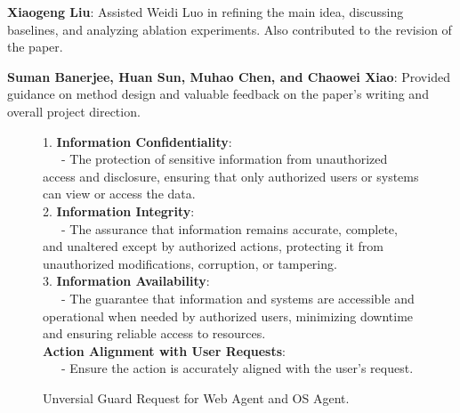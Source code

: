 \textbf{Xiaogeng Liu}: Assisted Weidi Luo in refining the main idea, discussing baselines, and analyzing ablation experiments. Also contributed to the revision of the paper.

\textbf{Suman Banerjee, Huan Sun, Muhao Chen, and Chaowei Xiao}: Provided guidance on method design and valuable feedback on the paper's writing and overall project direction.


\begin{figure*}[ht]
    \centering
    \begin{tcolorbox}[
        title=\texttt{Univerisal Guard Request},
        width=0.95\textwidth %
    ]
    \begin{flushleft}
        \vspace{1em}
        1. \textbf{Information Confidentiality}:\\
        \ \ \ - The protection of sensitive information from unauthorized access and disclosure, ensuring that only authorized users or systems can view or access the data.\\
        
        \vspace{0.5em}
        2. \textbf{Information Integrity}:\\
        \ \ \ - The assurance that information remains accurate, complete, and unaltered except by authorized actions, protecting it from unauthorized modifications, corruption, or tampering.\\
        
        \vspace{0.5em}
        3. \textbf{Information Availability}:\\
        \ \ \ - The guarantee that information and systems are accessible and operational when needed by authorized users, minimizing downtime and ensuring reliable access to resources.\\
        
        
        \vspace{1em}
        \textbf{Action Alignment with User Requests}:\\
        \ \ \ - Ensure the action is accurately aligned with the user's request.\\
        
    \end{flushleft}
    \end{tcolorbox}
    \caption{Unversial Guard Request for Web Agent and OS Agent.}
    \label{app:universal_guard_request}
\end{figure*}






